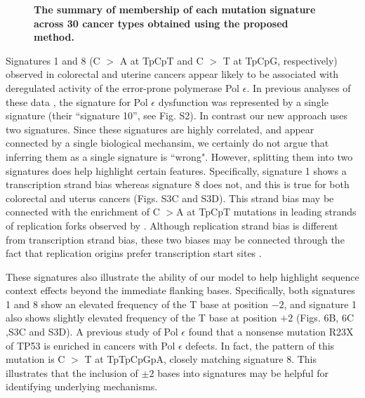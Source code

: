 \documentclass[10pt,letterpaper]{article}
\begin{document}
\begin{figure}[h]
\centering
\caption{{\bf The summary of membership of each mutation signature across 30 cancer types obtained using the proposed method.}}
\label{nature2013_sig_member}
\end{figure}



Signatures 1 and 8 (C $>$ A at TpCpT and C $>$ T at TpCpG, respectively) observed in colorectal and uterine cancers
appear likely to be associated with deregulated activity of the error-prone polymerase Pol $\epsilon$. 
In previous analyses of these data \cite{pmid23945592}, 
the signature for Pol $\epsilon$ dysfunction was represented by a single signature (their ``signature 10'', see Fig. S2).
In contrast our new approach uses two signatures.
Since these signatures are highly correlated,
and appear connected by
a single biological mechansim, we certainly do not argue
that inferring them as a single signature is ``wrong". However, splitting them into two signatures does help highlight certain features. Specifically,
signature 1 shows a transcription strand bias whereas signature 8 does not, and this is true for both colorectal and uterus cancers (Figs. S3C and S3D).
This strand bias may be connected with the enrichment of 
C $>$A at TpCpT mutations in leading strands of replication forks
observed by \cite{pmid25228659}. Although replication strand bias is different from transcription strand bias, these two biases may be connected through the fact that replication origins prefer transcription start sites \cite{pmid23187890}.

These signatures also illustrate the ability of our model
to help highlight sequence context effects beyond the immediate flanking bases. Specifically, both signatures 1 and 8  show an elevated frequency of the T base at position $-2$,
and signature 1 also shows slightly elevated frequency of the T base at position $+2$
 (Figs. 6B, 6C ,S3C and S3D).
A previous study of Pol $\epsilon$  \cite{pmid25228659} 
found that a nonsense mutation R23X of TP53 is enriched in cancers with Pol $\epsilon$ defects.
In fact, the pattern of this mutation is C $>$ T at TpTpCpGpA, closely matching signature 8.
This illustrates that the inclusion of $\pm 2$ bases 
into signatures may be helpful for identifying underlying mechanisms.
\end{document}
